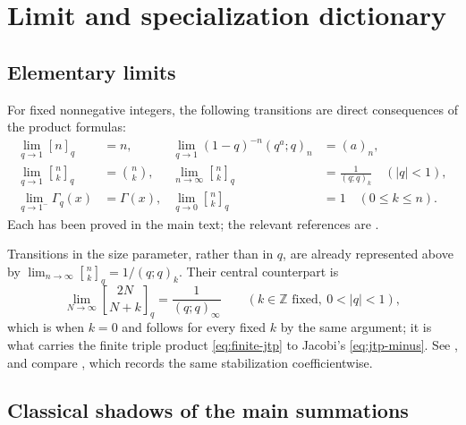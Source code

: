 \documentclass[11pt,oneside,openany]{book}
\theoremstyle{definition}
\theoremstyle{remark}
\newcommand{\qbinom}[2]{\genfrac{[}{]}{0pt}{}{#1}{#2}_{q}}
\newcommand{\Z}{\mathbb Z}
\newcommand{\abs}[1]{\lvert #1\rvert}
\begin{document}
\chapter{Limit and specialization dictionary}\label{app:limits}

\section{Elementary limits}

For fixed nonnegative integers, the following transitions are direct consequences of the product formulas:
\begin{align*}
 \lim_{q\to1}[n]_q&=n,
 &\lim_{q\to1}(1-q)^{-n}(q^a;q)_n&=(a)_n,\\
 \lim_{q\to1}\qbinom nk&=\binom nk,
 &\lim_{n\to\infty}\qbinom nk&=\frac1{(q;q)_k}\quad(\abs q<1),\\
 \lim_{q\to1^-}\Gamma_q(x)&=\Gamma(x),
 &\lim_{q\to0}\qbinom nk&=1\quad(0\le k\le n).
\end{align*}
Each has been proved in the main text; the relevant references are .

\medskip
Transitions in the size parameter, rather than in $q$, are already represented
above by $\lim_{n\to\infty}\qbinom nk=1/(q;q)_k$.  Their central counterpart is
\[
 \lim_{N\to\infty}\qbinom{2N}{N+k}=\frac1{(q;q)_\infty}
 \qquad(k\in\Z\text{ fixed},\ 0<\abs q<1),
\]
which is  when $k=0$ and follows for every fixed $k$
by the same argument; it is what carries the finite triple product
\eqref{eq:finite-jtp} to Jacobi's \eqref{eq:jtp-minus}.  See
, and compare
, which records the same stabilization
coefficientwise.

\section{Classical shadows of the main summations}
\end{document}
